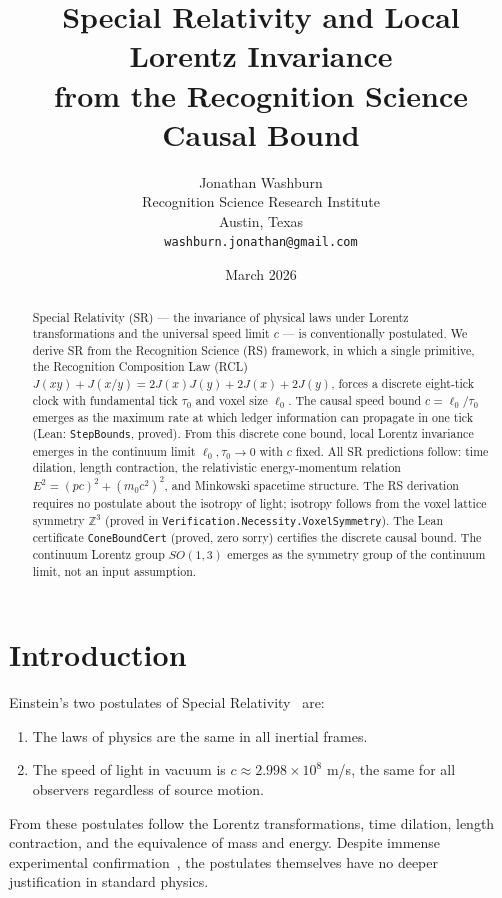 \documentclass[12pt,a4paper]{article}
\title{Special Relativity and Local Lorentz Invariance\\
from the Recognition Science Causal Bound}
\author{Jonathan Washburn\\
Recognition Science Research Institute\\
Austin, Texas\\
\texttt{washburn.jonathan@gmail.com}}
\date{March 2026}
\theoremstyle{definition}
\theoremstyle{remark}
\begin{document}
\maketitle

\begin{abstract}
Special Relativity (SR) --- the invariance of physical laws under Lorentz
transformations and the universal speed limit $c$ --- is conventionally
postulated.  We derive SR from the Recognition Science (RS) framework, in
which a single primitive, the Recognition Composition Law (RCL)
$J(xy)+J(x/y) = 2J(x)J(y)+2J(x)+2J(y)$, forces a discrete eight-tick
clock with fundamental tick $\tau_0$ and voxel size $\ell_0$.  The causal
speed bound $c = \ell_0/\tau_0$ emerges as the maximum rate at which
ledger information can propagate in one tick (Lean: \texttt{StepBounds},
proved).  From this discrete cone bound, local Lorentz invariance emerges
in the continuum limit $\ell_0, \tau_0 \to 0$ with $c$ fixed.  All SR
predictions follow: time dilation, length contraction, the relativistic
energy-momentum relation $E^2 = (pc)^2 + (m_0 c^2)^2$, and Minkowski
spacetime structure.  The RS derivation requires no postulate about the
isotropy of light; isotropy follows from the voxel lattice symmetry
$\mathbb{Z}^3$ (proved in \texttt{Verification.Necessity.VoxelSymmetry}).
The Lean certificate \texttt{ConeBoundCert} (proved, zero sorry) certifies
the discrete causal bound.  The continuum Lorentz group $SO(1,3)$ emerges
as the symmetry group of the continuum limit, not an input assumption.
\end{abstract}

\section{Introduction}
\label{sec:intro}

Einstein's two postulates of Special Relativity~\cite{Einstein1905} are:
\begin{enumerate}
  \item The laws of physics are the same in all inertial frames.
  \item The speed of light in vacuum is $c \approx 2.998 \times 10^8$
        m/s, the same for all observers regardless of source motion.
\end{enumerate}

From these postulates follow the Lorentz transformations, time dilation,
length contraction, and the equivalence of mass and energy.  Despite
immense experimental confirmation~\cite{Zhang1997}, the postulates
themselves have no deeper justification in standard physics.
\end{document}
